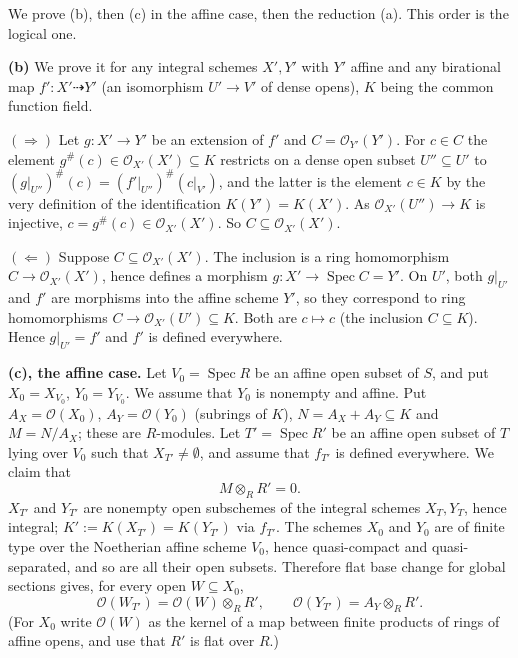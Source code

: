 \documentclass[11pt]{article}
\begin{document}
We prove (b), then (c) in the affine case, then the reduction (a). This order is the logical one.

\textbf{(b)} We prove it for any integral schemes $X',Y'$ with $Y'$ affine and any birational map $f':X'\dashrightarrow Y'$ (an isomorphism $U'\to V'$ of dense opens), $K$ being the common function field.

$(\Rightarrow)$ Let $g:X'\to Y'$ be an extension of $f'$ and $C=\mathcal O_{Y'}(Y')$. For $c\in C$ the element $g^\#(c)\in\mathcal O_{X'}(X')\subseteq K$ restricts on a dense open subset $U''\subseteq U'$ to $(g|_{U''})^\#(c)=(f'|_{U''})^\#(c|_{V'})$, and the latter is the element $c\in K$ by the very definition of the identification $K(Y')=K(X')$. As $\mathcal O_{X'}(U'')\to K$ is injective, $c=g^\#(c)\in\mathcal O_{X'}(X')$. So $C\subseteq\mathcal O_{X'}(X')$.

$(\Leftarrow)$ Suppose $C\subseteq\mathcal O_{X'}(X')$. The inclusion is a ring homomorphism $C\to\mathcal O_{X'}(X')$, hence defines a morphism $g:X'\to\operatorname{Spec}C=Y'$. On $U'$, both $g|_{U'}$ and $f'$ are morphisms into the affine scheme $Y'$, so they correspond to ring homomorphisms $C\to\mathcal O_{X'}(U')\subseteq K$. Both are $c\mapsto c$ (the inclusion $C\subseteq K$). Hence $g|_{U'}=f'$ and $f'$ is defined everywhere.

\textbf{(c), the affine case.} Let $V_0=\operatorname{Spec}R$ be an affine open subset of $S$, and put $X_0=X_{V_0}$, $Y_0=Y_{V_0}$. We assume that $Y_0$ is nonempty and affine. Put $A_X=\mathcal O(X_0)$, $A_Y=\mathcal O(Y_0)$ (subrings of $K$), $N=A_X+A_Y\subseteq K$ and $M=N/A_X$; these are $R$-modules. Let $T'=\operatorname{Spec}R'$ be an affine open subset of $T$ lying over $V_0$ such that $X_{T'}\neq\emptyset$, and assume that $f_{T'}$ is defined everywhere. We claim that
\[ M\otimes_RR'=0. \]
$X_{T'}$ and $Y_{T'}$ are nonempty open subschemes of the integral schemes $X_T,Y_T$, hence integral; $K':=K(X_{T'})=K(Y_{T'})$ via $f_{T'}$. The schemes $X_0$ and $Y_0$ are of finite type over the Noetherian affine scheme $V_0$, hence quasi-compact and quasi-separated, and so are all their open subsets. Therefore flat base change for global sections gives, for every open $W\subseteq X_0$,
\[ \mathcal O(W_{T'})=\mathcal O(W)\otimes_RR',\qquad \mathcal O(Y_{T'})=A_Y\otimes_RR'. \]
(For $X_0$ write $\mathcal O(W)$ as the kernel of a map between finite products of rings of affine opens, and use that $R'$ is flat over $R$.)
\end{document}

